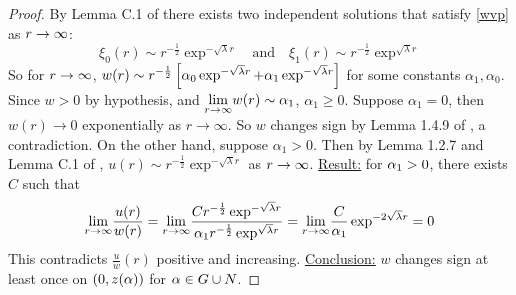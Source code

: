 \begin{lemma}
\begin{proof}

By Lemma C.1 of \cite{fthes} there exists two independent solutions that satisfy \ref{wvp} as $r\to\infty$: $$ \xi_0(r)\sim r^{-\frac{1}{2}}\exp^{-\sqrt{\lambda}r}\quad\text{and}
\quad\xi_1(r)\sim r^{-\frac{1}{2}}\exp^{\sqrt{\lambda}r}$$
So for $r\to\infty$,
$w(r)\sim r^{-\frac{1}{2}}\left[\alpha_0\exp^{-\sqrt{\lambda}r}+\alpha_1\exp^{-\sqrt{\lambda}r}\right]$
for some constants $\alpha_1,\alpha_0$.
Since $w>0$ by hypothesis, and $\underset{r\to\infty}{\lim} w(r)\sim\alpha_1$, $\alpha_1\geq0$.
Suppose $\alpha_1=0$, then $w(r)\to0$ exponentially as $r\to\infty$.
So $w$ changes sign by Lemma 1.4.9 of \cite{fthes}, a contradiction.
On the other hand, suppose $\alpha_1>0$.
Then by Lemma 1.2.7 and Lemma C.1 of \cite{fthes}, $u(r)\sim r^{-\frac{1}{2}}\exp^{-\sqrt{\lambda}r}$ as $r\to\infty$.
\underline{Result:} for $\alpha_1>0$, there exists $C$ such that $$
\underset{r\to\infty}{\lim}\frac{u(r)}{w(r)}=\underset{r\to\infty}{\lim}\frac{Cr^{-\frac{1}{2}}\exp^{-\sqrt{\lambda}r}}{\alpha_1r^{-\frac{1}{2}}\exp^{\sqrt{\lambda}r}}=\underset{r\to\infty}{\lim}\frac{C}{\alpha_1}\exp^{-2\sqrt{\lambda}r}=0 $$
This contradicts $\frac{u}{w}(r)$ positive and increasing.
\underline{Conclusion:} $w$ changes sign at least once on $(0,z(\alpha))$ for $\alpha\in G\cup N$.
\end{proof}
\end{lemma}
